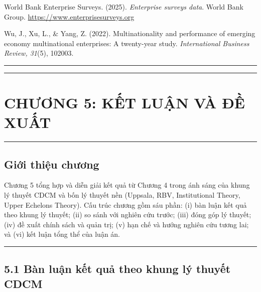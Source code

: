 \documentclass[12pt,a4paper]{article}
\begin{document}
World Bank Enterprise Surveys. (2025). \emph{Enterprise surveys data}.
World Bank Group. \url{https://www.enterprisesurveys.org}

Wu, J., Xu, L., \& Yang, Z. (2022). Multinationality and performance of
emerging economy multinational enterprises: A twenty-year study.
\emph{International Business Review, 31}(5), 102003.

\begin{center}\rule{0.5\linewidth}{0.5pt}\end{center}

\begin{center}\rule{0.5\linewidth}{0.5pt}\end{center}

\hypertarget{chux1b0ux1a1ng-5-kux1ebft-luux1eadn-vuxe0-ux111ux1ec1-xuux1ea5t}{%
\section{CHƯƠNG 5: KẾT LUẬN VÀ ĐỀ
XUẤT}\label{chux1b0ux1a1ng-5-kux1ebft-luux1eadn-vuxe0-ux111ux1ec1-xuux1ea5t}}

\begin{center}\rule{0.5\linewidth}{0.5pt}\end{center}

\hypertarget{giux1edbi-thiux1ec7u-chux1b0ux1a1ng-1}{%
\subsection{Giới thiệu
chương}\label{giux1edbi-thiux1ec7u-chux1b0ux1a1ng-1}}

Chương 5 tổng hợp và diễn giải kết quả từ Chương 4 trong ánh sáng của
khung lý thuyết CDCM và bốn lý thuyết nền (Uppsala, RBV, Institutional
Theory, Upper Echelons Theory). Cấu trúc chương gồm sáu phần: (i) bàn
luận kết quả theo khung lý thuyết; (ii) so sánh với nghiên cứu trước;
(iii) đóng góp lý thuyết; (iv) đề xuất chính sách và quản trị; (v) hạn
chế và hướng nghiên cứu tương lai; và (vi) kết luận tổng thể của luận
án.

\begin{center}\rule{0.5\linewidth}{0.5pt}\end{center}

\hypertarget{51-buxe0n-luux1eadn-kux1ebft-quux1ea3-theo-khung-luxfd-thuyux1ebft-cdcm}{%
\subsection{5.1 Bàn luận kết quả theo khung lý thuyết
CDCM}\label{51-buxe0n-luux1eadn-kux1ebft-quux1ea3-theo-khung-luxfd-thuyux1ebft-cdcm}}
\end{document}
